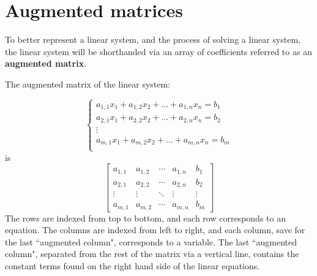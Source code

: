 \documentclass{article}
\begin{document}
\section*{Augmented matrices}

To better represent a linear system, and the process of solving a linear system, the linear system will be shorthanded via an array of coefficients referred to as an {\bf augmented matrix}. 

The augmented matrix of the linear system:

\[\left\{\begin{array}{c}
a_{1,1} x_1 + a_{1,2} x_2 + ... + a_{1,n} x_n = b_1 \\
a_{2,1} x_1 + a_{2,2} x_2 + ... + a_{2,n} x_n = b_2 \\
\vdots \\
a_{m,1} x_1 + a_{m,2} x_2 + ... + a_{m,n} x_n = b_m \\
\end{array}\right.\] 
is
\[\left[\begin{array}{cccc|c}
a_{1,1} & a_{1,2} & \cdots & a_{1,n} & b_1 \\   
a_{2,1} & a_{2,2} & \cdots & a_{2,n} & b_2 \\   
\vdots & \vdots & \ddots & \vdots & \vdots \\ 
a_{m,1} & a_{m,2} & \cdots & a_{m,n} & b_m 
\end{array}\right]\]
The rows are indexed from top to bottom, and each row corresponds to an equation. The columns are indexed from left to right, and each column, save for the last ``augmented column", corresponds to a variable. The last ``augmented column", separated from the rest of the matrix via a vertical line, contains the constant terms found on the right hand side of the linear equations.
\end{document}
